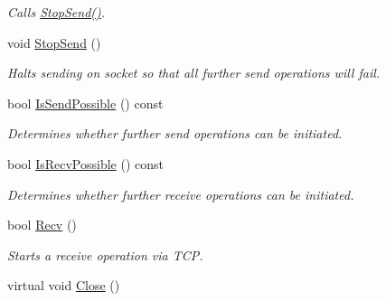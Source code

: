 \begin{DoxyCompactItemize}
\begin{DoxyCompactList}\small\item\em Calls \hyperlink{class_net_socket_t_c_p_a71e478845fc449fc9fccaa098db37c50}{StopSend()}. \item\end{DoxyCompactList}\item 
void \hyperlink{class_net_socket_t_c_p_a71e478845fc449fc9fccaa098db37c50}{StopSend} ()
\begin{DoxyCompactList}\small\item\em Halts sending on socket so that all further send operations will fail. \item\end{DoxyCompactList}\item 
bool \hyperlink{class_net_socket_t_c_p_a3bfb846d84dd1f29ece510f025adba3d}{IsSendPossible} () const 
\begin{DoxyCompactList}\small\item\em Determines whether further send operations can be initiated. \item\end{DoxyCompactList}\item 
bool \hyperlink{class_net_socket_t_c_p_a1e1063d77e9ae490c4c5146136141199}{IsRecvPossible} () const 
\begin{DoxyCompactList}\small\item\em Determines whether further receive operations can be initiated. \item\end{DoxyCompactList}\item 
bool \hyperlink{class_net_socket_t_c_p_a11891910910477cf1eba5fffef8bda52}{Recv} ()
\begin{DoxyCompactList}\small\item\em Starts a receive operation via TCP. \item\end{DoxyCompactList}\item 
\hypertarget{class_net_socket_t_c_p_a407a844020c03e9dd24048f38a4d2c1f}{
virtual void \hyperlink{class_net_socket_t_c_p_a407a844020c03e9dd24048f38a4d2c1f}{Close} ()}
\label{class_net_socket_t_c_p_a407a844020c03e9dd24048f38a4d2c1f}


\end{DoxyCompactItemize}
